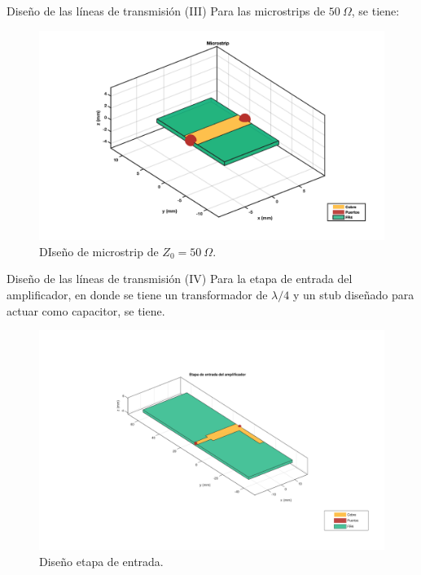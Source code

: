 \documentclass[9pt]{beamer}
\begin{document}
	\begin{frame}{Diseño de las líneas de transmisión (III)}
		Para las microstrips de $50 \ \Omega$, se tiene:
		\begin{figure}
			\centering
			\includegraphics[width=0.8\linewidth]{../microstrip_p}
			\caption{DIseño de microstrip de $Z_0=50 \ \Omega$.}
			\label{fig:microstripp}
		\end{figure}
	
	\end{frame}
	
	\begin{frame}{Diseño de las líneas de transmisión (IV)}
		Para la etapa de entrada del amplificador, en donde se tiene un transformador de $\lambda /4$ y un stub diseñado para actuar como capacitor, se tiene.
		
		\begin{figure}
			\centering
			\includegraphics[width=0.8\linewidth]{../entrada}
			\caption{Diseño etapa de entrada.}
			\label{fig:entrada}
		\end{figure}
		
	\end{frame}
	
\end{document}
